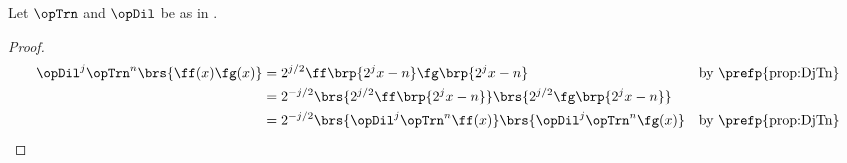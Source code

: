 

\begin{proposition}
\label{prop:DjTnfg}
Let $\opTrn$ and $\opDil$ be as in .
\end{proposition}
\begin{proof}
  \begin{align*}
    \opDil^j\opTrn^n\brs{\ff(x)\fg(x)}
      &= 2^{j/2}
         \ff\brp{2^jx-n}
         \fg\brp{2^jx-n}
      && \text{by \prefp{prop:DjTn}}
    \\&= 2^{-j/2}
         \brs{2^{j/2}\ff\brp{2^jx-n}}
         \brs{2^{j/2}\fg\brp{2^jx-n}}
    \\&= 2^{-j/2}
         \brs{\opDil^j\opTrn^n\ff(x)} \brs{\opDil^j\opTrn^n\fg(x)}
      && \text{by \prefp{prop:DjTn}}
  \end{align*}
\end{proof}

